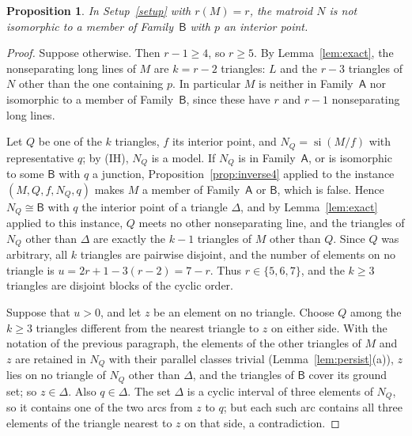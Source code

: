 \documentclass[11pt]{amsart}
\newtheorem{proposition}[theorem]{Proposition}
\theoremstyle{definition}
\theoremstyle{remark}
\numberwithin{equation}{section}
\newcommand{\si}{\operatorname{si}}
\newcommand{\FA}{\mathsf{A}}
\newcommand{\FB}{\mathsf{B}}
\begin{document}
\begin{proposition}\label{prop:Binterior}
In Setup~\textup{\ref{setup}} with $r(M)=r$, the matroid $N$ is not isomorphic to a member of Family~$\FB$ with $p$ an interior point.
\end{proposition}

\begin{proof}
Suppose otherwise. Then $r-1\ge4$, so $r\ge5$. By Lemma~\ref{lem:exact}, the nonseparating long lines of $M$ are $k=r-2$ triangles: $L$ and the $r-3$ triangles of $N$ other than the one containing $p$. In particular $M$ is neither in Family~$\FA$ nor isomorphic to a member of Family~$\FB$, since these have $r$ and $r-1$ nonseparating long lines.

Let $Q$ be one of the $k$ triangles, $f$ its interior point, and $N_Q=\si(M/f)$ with representative $q$; by (IH), $N_Q$ is a model. If $N_Q$ is in Family~$\FA$, or is isomorphic to some $\FB$ with $q$ a junction, Proposition~\ref{prop:inverse4} applied to the instance $(M,Q,f,N_Q,q)$ makes $M$ a member of Family~$\FA$ or $\FB$, which is false. Hence $N_Q\cong\FB$ with $q$ the interior point of a triangle $\Delta$, and by Lemma~\ref{lem:exact} applied to this instance, $Q$ meets no other nonseparating line, and the triangles of $N_Q$ other than $\Delta$ are exactly the $k-1$ triangles of $M$ other than $Q$. Since $Q$ was arbitrary, all $k$ triangles are pairwise disjoint, and the number of elements on no triangle is $u=2r+1-3(r-2)=7-r$. Thus $r\in\{5,6,7\}$, and the $k\ge3$ triangles are disjoint blocks of the cyclic order.

Suppose that $u>0$, and let $z$ be an element on no triangle. Choose $Q$ among the $k\ge3$ triangles different from the nearest triangle to $z$ on either side. With the notation of the previous paragraph, the elements of the other triangles of $M$ and $z$ are retained in $N_Q$ with their parallel classes trivial (Lemma~\ref{lem:persist}(a)), $z$ lies on no triangle of $N_Q$ other than $\Delta$, and the triangles of $\FB$ cover its ground set; so $z\in \Delta$. Also $q\in \Delta$. The set $\Delta$ is a cyclic interval of three elements of $N_Q$, so it contains one of the two arcs from $z$ to $q$; but each such arc contains all three elements of the triangle nearest to $z$ on that side, a contradiction.


\end{proof}
\end{document}
